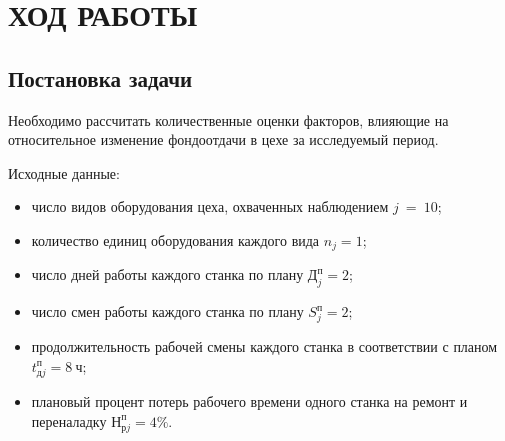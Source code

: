 \section{ХОД РАБОТЫ}

\subsection{Постановка задачи}

Необходимо рассчитать количественные оценки факторов, влияющие
на относительное изменение фондоотдачи в цехе за исследуемый период.

Исходные данные:

\begin{itemize}
  \item число видов оборудования цеха, охваченных наблюдением $ j~=~10 $;
  \item количество единиц оборудования каждого вида $ n_j = 1$;
  \item число дней работы каждого станка по плану $ \text{Д}_j^{\text{п}} = 2 $;
  \item число смен работы каждого станка по плану $ S^\text{п}_j = 2 $;
  \item продолжительность рабочей смены каждого станка в соответствии 
    с планом $ t^\text{п}_{\text{д}j} = 8\>\text{ч}$;
  \item плановый процент потерь рабочего времени одного станка на ремонт и
    переналадку $ \text{Н}^\text{п}_{\text{р}j} = 4 \%$.
\end{itemize}


